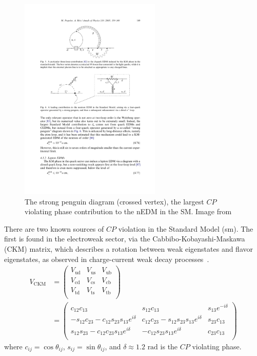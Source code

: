 
\begin{figure}[htp]
    \centering
    \includegraphics[width=0.6\textwidth]{figures/Pospelov_strong_penguin.pdf}
    \caption[The strong penguin diagram, the largest $CP$ violating phase contribution to the nEDM in the SM]
    {The strong penguin diagram (crossed vertex), the largest $CP$ violating phase contribution to the nEDM in the SM. Image from \cite{POS05}}
    \label{fig:strong_penguin}
\end{figure}

There are two known sources of $CP$ violation in the Standard Model (\acrshort*{sm}). The first is found in the electroweak sector, via the Cabbibo-Kobayashi-Maskawa (CKM) matrix, which describes a rotation between weak eigenstates and flavor eigenstates, as observed in charge-current weak decay processes~\cite{ckm1973, ChauKeung1984, pdg2022}.
%
\begin{align}
    V_\text{CKM} &= \left( \begin{matrix}
    V_\text{ud} & V_\text{us} & V_\text{ub} \\
    V_\text{cd} & V_\text{cs} & V_\text{cb} \\
    V_\text{td} & V_\text{ts} & V_\text{tb} \\
    \end{matrix} \right) \label{eq:CKM} \\
    &= \left( \begin{matrix}
    c_{12}c_{13} & s_{12}c_{13} & s_{13}e^{-i\delta} \\
    -s_{12}c_{23}-c_{12}s_{23}s_{13}e^{i\delta} & c_{12}c_{23}-s_{12}s_{23}s_{13}e^{i\delta} & s_{23}c_{13} \\
    s_{12}s_{23}-c_{12}c_{23}s_{13}e^{i\delta} & -c_{12}s_{23}s_{13}e^{i\delta} & c_{23}c_{13} \\
    \end{matrix} \right)
\end{align}
%
where $c_{ij}=\cos\theta_{ij}$, $s_{ij}=\sin\theta_{ij}$, and $\delta\approx1.2\text{ rad}$ is the $CP$ violating phase.

